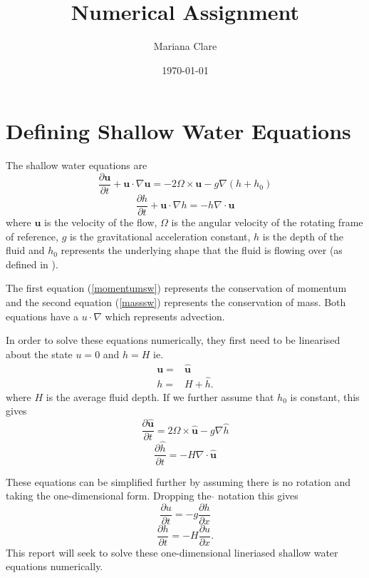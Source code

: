 \documentclass[a4paper,12pt, notitlepage]{report}
\title{Numerical Assignment}
\author{Mariana Clare}
\date{\today}
\begin{document}
	
\maketitle
\thispagestyle{empty}
\section*{Defining Shallow Water Equations}
The shallow water equations are
\begin{equation}\label{momentumsw}
\frac{\partial \mathbf{u}}{\partial t} + \mathbf{u}\cdot\nabla\mathbf{u} = - 2\Omega \times\mathbf{u} - g\nabla (h + h_{0})
\end{equation}
\begin{equation}\label{masssw}
\frac{\partial h}{\partial t} + \mathbf{u}\cdot\nabla h = - h \nabla \cdot \mathbf{u}
\end{equation}
where $\mathbf{u}$ is the velocity of the flow, $\Omega$ is the angular velocity of the rotating frame of reference, $g$ is the gravitational acceleration constant, $h$ is the depth of the fluid and $h_{0}$ represents the underlying shape that the fluid is flowing over (as defined in \cite{MPE textbook}).

The first equation (\ref{momentumsw}) represents the conservation of momentum and the second equation (\ref{masssw}) represents the conservation of mass. Both equations have a $u\cdot\nabla$ which represents advection.

In order to solve these equations numerically, they first need to be linearised about the state $u = 0$ and $h = H$ ie.
\begin{eqnarray}\nonumber
\mathbf{u} =  & \mathbf{\hat{u}}
 \\   \nonumber
h = &  H + \hat{h} .
\end{eqnarray}
where $H$ is the average fluid depth. If we further assume that $h_{0}$ is constant, this gives
\begin{equation}
\frac{\partial \mathbf{\hat{u}}}{\partial t} = 2 \Omega \times \mathbf{\hat{u}} - g \nabla \hat{h}
\end{equation}
\begin{equation}
\frac{\partial \hat{h}}{\partial t} = - H \nabla \cdot \mathbf{\hat{u}}
\end{equation}

These equations can be simplified further by assuming there is no rotation and taking the one-dimensional form. Dropping the $\hat{}$ notation this gives
\begin{equation}\label{linearisedsw1}
\frac{\partial u}{\partial t} = - g \frac{\partial h}{\partial x}
\end{equation}
\begin{equation}\label{linearisedsw2}
\frac{\partial h}{\partial t} = - H \frac{\partial u}{\partial x}.
\end{equation}
This report will seek to solve these one-dimensional lineriased shallow water equations numerically.
\end{document}
